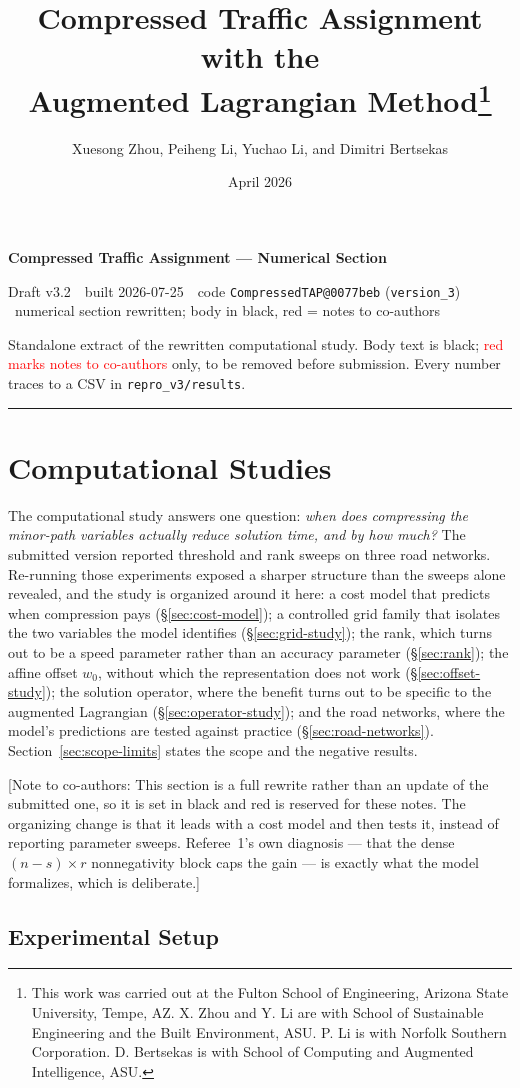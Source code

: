 \documentclass[11pt]{article}
\title{Compressed Traffic Assignment with the \\Augmented Lagrangian Method\footnote{
This work was carried out at the Fulton School of Engineering, Arizona State University, Tempe, AZ. X. Zhou and Y. Li are with School of Sustainable Engineering and the Built Environment, ASU. P. Li is with Norfolk Southern Corporation. D. Bertsekas is with School of Computing and Augmented Intelligence, ASU.}}
\author{Xuesong Zhou, Peiheng Li, Yuchao Li, and Dimitri Bertsekas}
\date{April 2026}
\makeatletter
\newcommand{\docver}{v3.2}
\newcommand{\docdate}{2026-07-25}
\newcommand{\doccommit}{0077beb}
\newcommand{\docstamp}{Draft \docver\ \textbullet\ built \docdate\ \textbullet\ code
  \texttt{CompressedTAP@\doccommit} (\texttt{version\_3}) \textbullet\ numerical section
  rewritten; body in black, red = notes to co-authors}
\newcommand{\conote}[1]{{\color{red}\small\textsf{[Note to co-authors: #1]}}}
\makeatother
\begin{document}
{\Large\bfseries Compressed Traffic Assignment --- Numerical Section}\par
\vspace{3pt}
{\small\textsf{\docstamp}}\par
\vspace{3pt}
{\small Standalone extract of the rewritten computational study. Body text is black;
\textcolor{red}{red marks notes to co-authors} only, to be removed before submission.
Every number traces to a CSV in \texttt{repro\_v3/results}.}
\vspace{8pt}\hrule\vspace{8pt}
\section{Computational Studies}
\label{sec:experiments}
\label{sec:experiments}\label{sec:computational}


The computational study answers one question: \emph{when does compressing the minor-path
variables actually reduce solution time, and by how much?} The submitted version reported
threshold and rank sweeps on three road networks. Re-running those experiments exposed a
sharper structure than the sweeps alone revealed, and the study is organized around it here:
a cost model that predicts when compression pays (\S\ref{sec:cost-model}); a controlled grid
family that isolates the two variables the model identifies (\S\ref{sec:grid-study}); the
rank, which turns out to be a speed parameter rather than an accuracy parameter
(\S\ref{sec:rank}); the affine offset $w_0$, without which the representation does not work
(\S\ref{sec:offset-study}); the solution operator, where the benefit turns out to be specific
to the augmented Lagrangian (\S\ref{sec:operator-study}); and the road networks, where the
model's predictions are tested against practice (\S\ref{sec:road-networks}).
Section~\ref{sec:scope-limits} states the scope and the negative results.

\conote{This section is a full rewrite rather than an update of the submitted one, so it is
set in black and red is reserved for these notes. The organizing change is that it leads with
a cost model and then tests it, instead of reporting parameter sweeps. Referee~1's own
diagnosis --- that the dense $(n-s)\times r$ nonnegativity block caps the gain --- is exactly
what the model formalizes, which is deliberate.}


\subsection{Experimental Setup}
\label{sec:setup}
\end{document}
